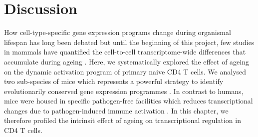 
\section{Discussion}


How cell-type-specific gene expression programs change during organismal lifespan has long been debated \citep{Bahar2006, Warren2007} but until the beginning of this project, few studies in mammals have quantified the cell-to-cell transcriptome-wide differences that accumulate during ageing \citep{Kowalczyk2015}. Here, we systematically explored the effect of ageing on the dynamic activation program of primary naive CD4\plus{} T cells. We analysed two sub-species of mice which represents a powerful strategy to identify evolutionarily conserved gene expression programmes \citep{Shay2013}. In contrast to humans, mice were housed in specific pathogen-free facilities which reduces transcriptional changes due to pathogen-induced immune activation \citep{Beura2016}. In this chapter, we therefore profiled the intrinsit effect of ageing on transcriptional regulation in CD4\plus{} T cells.\\

